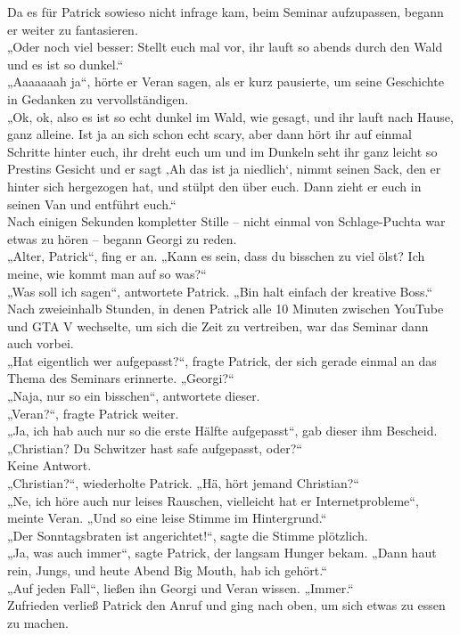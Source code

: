 \documentclass[oneside]{memoir}
\begin{document}
Da es für Patrick sowieso nicht infrage kam, beim Seminar aufzupassen, begann er weiter zu fantasieren. \\
„Oder noch viel besser: Stellt euch mal vor, ihr lauft so abends durch den Wald und es ist so dunkel.“ \\
„Aaaaaaah ja“, hörte er Veran sagen, als er kurz pausierte, um seine Geschichte in Gedanken zu vervollständigen. \\
„Ok, ok, also es ist so echt dunkel im Wald, wie gesagt, und ihr lauft nach Hause, ganz alleine. Ist ja an sich schon echt scary, aber dann hört ihr auf einmal Schritte hinter euch, ihr dreht euch um und im Dunkeln seht ihr ganz leicht so Prestins Gesicht und er sagt ‚Ah das ist ja niedlich‘, nimmt seinen Sack, den er hinter sich hergezogen hat, und stülpt den über euch. Dann zieht er euch in seinen Van und entführt euch.“ \\
Nach einigen Sekunden kompletter Stille -- nicht einmal von Schlage-Puchta war etwas zu hören -- begann Georgi zu reden. \\
„Alter, Patrick“, fing er an. „Kann es sein, dass du bisschen zu viel ölst? Ich meine, wie kommt man auf so was?“ \\
„Was soll ich sagen“, antwortete Patrick. „Bin halt einfach der kreative Boss.“ Nach zweieinhalb Stunden, in denen Patrick alle 10 Minuten zwischen YouTube und GTA V wechselte, um sich die Zeit zu vertreiben, war das Seminar dann auch vorbei. \\
„Hat eigentlich wer aufgepasst?“, fragte Patrick, der sich gerade einmal an das Thema des Seminars erinnerte. „Georgi?“ \\
„Naja, nur so ein bisschen“, antwortete dieser. \\
„Veran?“, fragte Patrick weiter. \\
„Ja, ich hab auch nur so die erste Hälfte aufgepasst“, gab dieser ihm Bescheid. \\
„Christian? Du Schwitzer hast safe aufgepasst, oder?“ \\
Keine Antwort. \\
„Christian?“, wiederholte Patrick. „Hä, hört jemand Christian?“ \\
„Ne, ich höre auch nur leises Rauschen, vielleicht hat er Internetprobleme“, meinte Veran. „Und so eine leise Stimme im Hintergrund.“ \\
„Der Sonntagsbraten ist angerichtet!“, sagte die Stimme plötzlich. \\
„Ja, was auch immer“, sagte Patrick, der langsam Hunger bekam. „Dann haut rein, Jungs, und heute Abend Big Mouth, hab ich gehört.“ \\
„Auf jeden Fall“, ließen ihn Georgi und Veran wissen. „Immer.“ \\
Zufrieden verließ Patrick den Anruf und ging nach oben, um sich etwas zu essen zu machen.     
     
\end{document}
